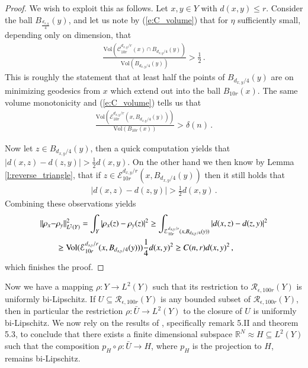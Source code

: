 \documentclass[11pt]{article}
\newcommand{\Vol}{\text{Vol}}
\newcommand{\RR}{\mathds{R}}
\newcommand{\cC}{\mathcal{C}}
\newcommand{\cE}{\mathcal{E}}
\newcommand{\cR}{\mathcal{R}}
\begin{document}
\begin{proof}
We wish to exploit this as follows.  Let $x,y\in Y$ with $d(x,y)\leq r$.  Consider the ball $B_{\frac{d_{x,y}}{4}}(y)$, and let us note by (\ref{e:C_volume}) that for $\eta$ sufficiently small, depending only on dimension, that
\begin{align}
\frac{\Vol(\cC^{d_{x,y}/r}_{10r}(x)\cap B_{d_{x,y}/4}(y))}{\Vol(B_{d_{x,y}/4}(y))}>\frac{1}{2}\, .
\end{align}
This is roughly the statement that at least half the points of $B_{d_{x,y}/4}(y)$ are on minimizing geodesics from $x$ which extend out into the ball $B_{10r}(x)$.  The same volume monotonicity and (\ref{e:C_volume}) tells us that
\begin{align}
\frac{\Vol(\cE^{d_{x,y}/r}_{10r}(x,B_{d_{x,y}/4}(y)))}{\Vol(B_{10r}(x))}>\delta(n)\, .
\end{align}

Now let $z\in B_{d_{x,y}/4}(y)$, then a quick computation yields that $|d(x,z)-d(z,y)|>\frac{1}{2}d(x,y)$.  On the other hand we then know by Lemma \ref{l:reverse_triangle}, that if $z\in \cE^{d_{x,y}/r}_{10r}(x,B_{d_{x,y}/4}(y))$ then it still holds that
\begin{align}
|d(x,z)-d(z,y)|>\frac{1}{2}d(x,y)\, .
\end{align}
Combining these observations yields
\begin{align}
||\rho_x-&\rho_y||^2_{L^2(Y)}=\int_Y |\rho_x(z)-\rho_y(z)|^2\geq \int_{\cE^{d_{x,y}/r}_{10r}(x,B_{d_{x,y}/4}(y))}|d(x,z)-d(z,y)|^2\notag\\
&\geq\Vol(\cE^{d_{x,y}/r}_{10r}(x,B_{d_{x,y}/4}(y)))\frac{1}{4}d(x,y)^2\geq C(n,r)d(x,y)^2\, ,
\end{align}
which finishes the proof.
\end{proof}

Now we have a mapping $\rho:Y\rightarrow L^2(Y)$ such that its restriction to $\cR_{\epsilon,100r}(Y)$ is uniformly bi-Lipschitz.  If $U\subseteq \cR_{\epsilon,100r}(Y)$ is any bounded subset of $\cR_{\epsilon,100r}(Y)$, then in particular the restriction $\rho:\bar U\rightarrow L^2(Y)$ to the closure of $U$ is uniformly bi-Lipschitz.  We now rely on the results of \cite{MoWe}, specifically remark 5.II and theorem 5.3, to conclude that there exists a finite dimensional subspace $\RR^N\approx H\subseteq L^2(Y)$ such that the composition $p_H\circ\rho:\bar U\to H$, where $p_H$ is the projection to $H$, remains bi-Lipschitz.


\end{document}
